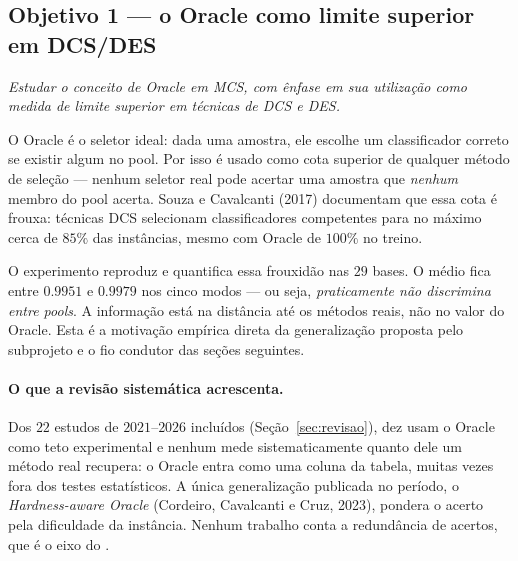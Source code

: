 \subsection{Objetivo 1 --- o Oracle como limite superior em DCS/DES}
\label{sec:obj1}

\textit{Estudar o conceito de Oracle em MCS, com ênfase em sua utilização como
medida de limite superior em técnicas de DCS e DES.}

O Oracle é o seletor ideal: dada uma amostra, ele escolhe um classificador correto
se existir algum no pool. Por isso é usado como cota superior de qualquer método de
seleção --- nenhum seletor real pode acertar uma amostra que \emph{nenhum} membro do
pool acerta. Souza e Cavalcanti (2017) documentam que essa cota é frouxa: técnicas
DCS selecionam classificadores competentes para no máximo cerca de $85\%$ das
instâncias, mesmo com Oracle de $100\%$ no treino.

O experimento reproduz e quantifica essa frouxidão nas $29$ bases. O  médio
fica entre $0.9951$ e $0.9979$ nos cinco modos --- ou seja, \emph{praticamente não
discrimina entre pools}. A informação está na distância até os métodos reais, não no
valor do Oracle. Esta é a motivação empírica direta da generalização proposta pelo
subprojeto e o fio condutor das seções seguintes.

\paragraph{O que a revisão sistemática acrescenta.} Dos $22$ estudos de
$2021$--$2026$ incluídos (Seção~\ref{sec:revisao}), dez usam o Oracle como teto
experimental e nenhum mede sistematicamente quanto dele um método real
recupera: o Oracle entra como uma coluna da tabela, muitas vezes fora dos
testes estatísticos. A única generalização publicada no período, o
\emph{Hardness-aware Oracle} (Cordeiro, Cavalcanti e Cruz, 2023), pondera o
acerto pela dificuldade da instância. Nenhum trabalho conta a redundância de
acertos, que é o eixo do .
